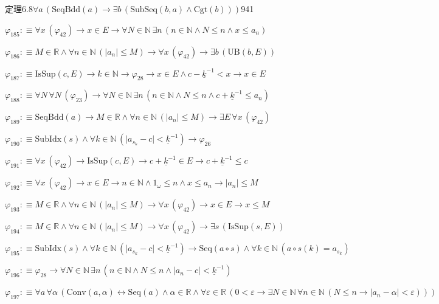 \begin{fullproof}{定理6.8}{$\forall a\,(\mathrm{SeqBdd}(a) \to \exists b\,(\mathrm{SubSeq}(b,a) \land \mathrm{Cgt}(b)))$}{941}
\begin{abbrevlist}
\item $\varphi_{185} :\equiv \forall x\,(\varphi_{42}) \to x \in E \to \forall N \in \mathbb{N}\,\exists n\,(n \in \mathbb{N} \land N \leq n \land x \leq a_{n})$
\item $\varphi_{186} :\equiv M \in \mathbb{R} \land \forall n \in \mathbb{N}\,(\lvert a_{n} \rvert \leq M) \to \forall x\,(\varphi_{42}) \to \exists b\,(\mathrm{UB}(b,E))$
\item $\varphi_{187} :\equiv \mathrm{IsSup}(c,E) \to k \in \mathbb{N} \to \varphi_{28} \to x \in E \land c - \underline{k}^{-1} < x \to x \in E$
\item $\varphi_{188} :\equiv \forall N\,\forall N\,(\varphi_{23}) \to \forall N \in \mathbb{N}\,\exists n\,(n \in \mathbb{N} \land N \leq n \land c + \underline{k}^{-1} \leq a_{n})$
\item $\varphi_{189} :\equiv \mathrm{SeqBdd}(a) \to M \in \mathbb{R} \land \forall n \in \mathbb{N}\,(\lvert a_{n} \rvert \leq M) \to \exists E\,\forall x\,(\varphi_{42})$
\item $\varphi_{190} :\equiv \mathrm{SubIdx}(s) \land \forall k \in \mathbb{N}\,(\lvert a_{s_{k}} - c \rvert < \underline{k}^{-1}) \to \varphi_{26}$
\item $\varphi_{191} :\equiv \forall x\,(\varphi_{42}) \to \mathrm{IsSup}(c,E) \to c + \underline{k}^{-1} \in E \to c + \underline{k}^{-1} \leq c$
\item $\varphi_{192} :\equiv \forall x\,(\varphi_{42}) \to x \in E \to n \in \mathbb{N} \land 1_{\omega} \leq n \land x \leq a_{n} \to \lvert a_{n} \rvert \leq M$
\item $\varphi_{193} :\equiv M \in \mathbb{R} \land \forall n \in \mathbb{N}\,(\lvert a_{n} \rvert \leq M) \to \forall x\,(\varphi_{42}) \to x \in E \to x \leq M$
\item $\varphi_{194} :\equiv M \in \mathbb{R} \land \forall n \in \mathbb{N}\,(\lvert a_{n} \rvert \leq M) \to \forall x\,(\varphi_{42}) \to \exists s\,(\mathrm{IsSup}(s,E))$
\item $\varphi_{195} :\equiv \mathrm{SubIdx}(s) \land \forall k \in \mathbb{N}\,(\lvert a_{s_{k}} - c \rvert < \underline{k}^{-1}) \to \mathrm{Seq}(a \circ s) \land \forall k \in \mathbb{N}\,(a \circ s(k) = a_{s_{k}})$
\item $\varphi_{196} :\equiv \varphi_{28} \to \forall N \in \mathbb{N}\,\exists n\,(n \in \mathbb{N} \land N \leq n \land \lvert a_{n} - c \rvert < \underline{k}^{-1})$
\item $\varphi_{197} :\equiv \forall a\,\forall \alpha\,(\mathrm{Conv}(a,\alpha) \leftrightarrow \mathrm{Seq}(a) \land \alpha \in \mathbb{R} \land \forall \varepsilon \in \mathbb{R}\,(0 < \varepsilon \to \exists N \in \mathbb{N}\,\forall n \in \mathbb{N}\,(N \leq n \to \lvert a_{n} - \alpha \rvert < \varepsilon)))$

\end{abbrevlist}
\end{fullproof}
